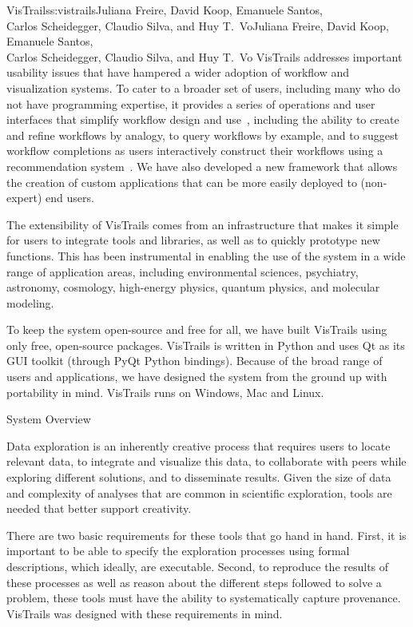 \begin{aosachaptertoc}{VisTrails}{s:vistrails}{Juliana Freire, David Koop, Emanuele Santos, \\ Carlos Scheidegger, Claudio Silva, and Huy T.\ Vo}{Juliana Freire, David Koop, Emanuele Santos, \\ \hspace*{0.9cm} Carlos Scheidegger, Claudio Silva, and Huy T.\ Vo}
VisTrails addresses important usability issues that have hampered a
wider adoption of workflow and visualization systems.  To cater to a
broader set of users, including many who do not have programming
expertise, it provides a series of operations and user interfaces that
simplify workflow design and use~\cite{bib:freire:vistrails}, including the ability to create and
refine workflows by analogy, to query workflows by example, and to
suggest workflow completions as users interactively construct their
workflows using a recommendation
system~\cite{bib:scheidegger:analogy}. We have also developed a new
framework that allows the creation of custom applications that can be
more easily deployed to (non-expert) end users.

The extensibility of VisTrails comes from an infrastructure that makes
it simple for users to integrate tools and libraries, as well as to
quickly prototype new functions. This has been instrumental in
enabling the use of the system in a wide range of application areas,
including environmental sciences, psychiatry, astronomy, cosmology,
high-energy physics, quantum physics, and molecular modeling.

To keep the system open-source and free for all, we have built
VisTrails using only free, open-source packages. VisTrails is written
in Python and uses Qt as its GUI toolkit (through PyQt Python
bindings).  Because of the broad range of users and applications, we
have designed the system from the ground up with portability in
mind. VisTrails runs on Windows, Mac and Linux.


\begin{aosasect1}{System Overview}

Data exploration is an inherently creative process that requires users
to locate relevant data, to integrate and visualize this data, to
collaborate with peers while exploring different solutions, and to
disseminate results.  Given the size of data and complexity of
analyses that are common in scientific exploration, tools are needed
that better support creativity.

There are two basic requirements for these tools that go hand in
hand. First, it is important to be able to specify the exploration
processes using formal descriptions, which ideally, are
executable. Second, to reproduce the results of these
processes as well as reason about the different steps followed to
solve a problem, these tools must have the ability to systematically
capture provenance. VisTrails was designed with these requirements in
mind.


\end{aosasect1}
\end{aosachaptertoc}
